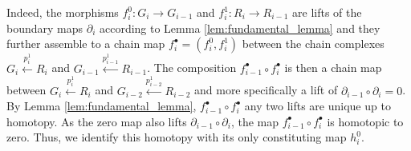 \documentclass[11pt]{article}
\begin{document}
%
Indeed, the morphisms $f^0_i:G_i\rightarrow G_{i-1}$ and $f^1_i:R_i\rightarrow R_{i-1}$ are lifts of the boundary maps $\partial_i$ according to Lemma \ref{lem:fundamental_lemma} and they further assemble to a chain map $f^\bullet_i=(f^0_i,f^1_i)$ between the chain complexes $G_i\xleftarrow{p^1_i}R_i$ and $G_{i-1}\xleftarrow{p^1_{i-1}} R_{i-1}$. The composition $f^\bullet_{i-1}\circ f^\bullet_i$ is then a chain map between $G_i\xleftarrow{p^1_i}R_i$ and $G_{i-2}\xleftarrow{p^1_{i-2}}R_{i-2}$ and more specifically a lift of $\partial_{i-1}\circ\partial_i=0$. By Lemma \ref{lem:fundamental_lemma}, $f^\bullet_{i-1}\circ f^\bullet_i$ any two lifts are unique up to homotopy. As the zero map also lifts $\partial_{i-1}\circ \partial_i$, the map $f^\bullet_{i-1}\circ f^\bullet_i$ is homotopic to zero. Thus, we identify this homotopy with its only constituting map $h^0_i$. 
%
\end{document}
